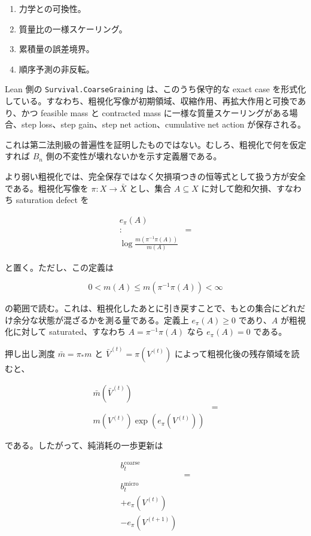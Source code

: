 \documentclass[12pt,a4paper]{article}
\begin{document}
\begin{enumerate}
\def\labelenumi{\arabic{enumi}.}
\tightlist
\item
  力学との可換性。
\item
  質量比の一様スケーリング。
\item
  累積量の誤差境界。
\item
  順序予測の非反転。
\end{enumerate}

Lean 側の \texttt{Survival.CoarseGraining} は、このうち保守的な exact case を形式化している。すなわち、粗視化写像が初期領域、収縮作用、再拡大作用と可換であり、かつ feasible mass と contracted mass に一様な質量スケーリングがある場合、step loss、step gain、step net action、cumulative net action が保存される。

これは第二法則級の普遍性を証明したものではない。むしろ、粗視化で何を仮定すれば \(B_{n}\) 側の不変性が壊れないかを示す定義層である。

より弱い粗視化では、完全保存ではなく欠損項つきの恒等式として扱う方が安全である。粗視化写像を \(\pi:X\to\bar X\) とし、集合 \(A\subseteq X\) に対して飽和欠損、すなわち saturation defect を

\[
\begin{aligned}
e_\pi(A) \\
:&= \\
\log\frac{m(\pi^{-1}\pi(A))}{m(A)}
\end{aligned}
\]

と置く。ただし、この定義は

\[
0<m(A)\le m(\pi^{-1}\pi(A))<\infty
\]

の範囲で読む。これは、粗視化したあとに引き戻すことで、もとの集合にどれだけ余分な状態が混ざるかを測る量である。定義上 \(e_\pi(A)\ge 0\) であり、\(A\) が粗視化に対して saturated、すなわち \(A=\pi^{-1}\pi(A)\) なら \(e_\pi(A)=0\) である。

押し出し測度 \(\bar m=\pi_*m\) と \(\bar V^{(t)}=\pi(V^{(t)})\) によって粗視化後の残存領域を読むと、

\[
\begin{aligned}
\bar m(\bar V^{(t)}) \\
&= \\
m(V^{(t)})\exp(e_\pi(V^{(t)}))
\end{aligned}
\]

である。したがって、純消耗の一歩更新は

\[
\begin{aligned}
b_{t}^{\mathrm{coarse}} \\
&= \\
b_{t}^{\mathrm{micro}} \\
+ e_\pi(V^{(t)}) \\
- e_\pi(V^{(t+1)})
\end{aligned}
\]
\end{document}

